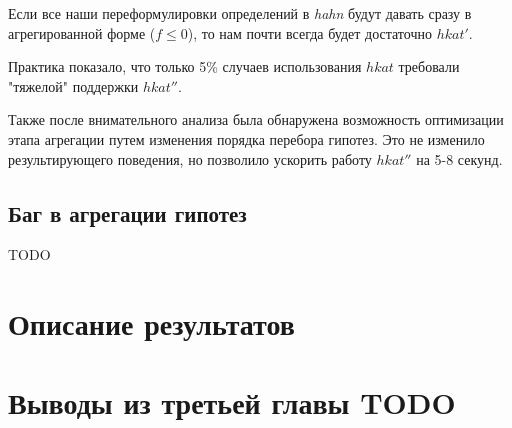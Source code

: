\documentclass[times
              ]{itmo-student-thesis}
\begin{document}
      Если все наши переформулировки определений в  \textit{hahn} будут давать сразу в агрегированной форме ($ f \leq 0 $),
      то нам почти всегда будет достаточно $ hkat' $.

      Практика показало, что только 5\% случаев использования $ hkat $ требовали "тяжелой" поддержки $ hkat'' $.

      Также после внимательного анализа была обнаружена возможность оптимизации этапа агрегации путем изменения порядка перебора гипотез.
      Это не изменило результирующего поведения, но позволило ускорить работу $ hkat'' $ на 5-8 секунд.

    \subsection{Баг в агрегации гипотез}

      TODO

  \section{Описание результатов}

  \section{Выводы из третьей главы TODO}



\end{document}
